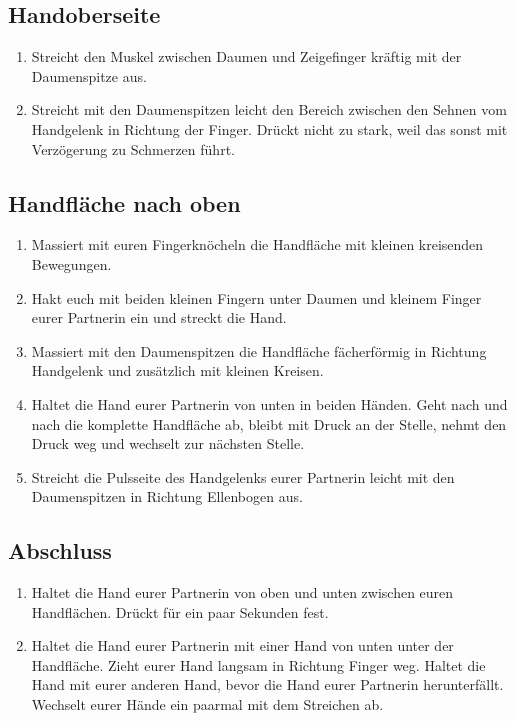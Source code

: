 \subsection{Handoberseite}
\begin{enumerate}
	\item {} Streicht den Muskel zwischen Daumen und Zeigefinger kräftig mit der Daumenspitze aus.
	\item {} Streicht mit den Daumenspitzen leicht den Bereich zwischen den Sehnen vom Handgelenk in Richtung der Finger. Drückt nicht zu stark, weil das sonst mit Verzögerung zu Schmerzen führt.
\end{enumerate}

\subsection{Handfläche nach oben}
\begin{enumerate}
	\item {} Massiert mit euren Fingerknöcheln die Handfläche mit kleinen kreisenden Bewegungen.
	\item {} Hakt euch mit beiden kleinen Fingern unter Daumen und kleinem Finger eurer Partnerin ein und streckt die Hand.
	\item {} Massiert mit den Daumenspitzen die Handfläche fächerförmig in Richtung Handgelenk und zusätzlich mit kleinen Kreisen.
	\item {} Haltet die Hand eurer Partnerin von unten in beiden Händen. Geht nach und nach die komplette Handfläche ab, bleibt mit Druck an der Stelle, nehmt den Druck weg und wechselt zur nächsten Stelle.
	\item {} Streicht die Pulsseite des Handgelenks eurer Partnerin leicht mit den Daumenspitzen in Richtung Ellenbogen aus.
\end{enumerate}

\subsection{Abschluss}
\begin{enumerate}
	\item {} Haltet die Hand eurer Partnerin von oben und unten zwischen euren Handflächen. Drückt für ein paar Sekunden fest.
	\item {} Haltet die Hand eurer Partnerin mit einer Hand von unten unter der Handfläche. Zieht eurer Hand langsam in Richtung Finger weg. Haltet die Hand mit eurer anderen Hand, bevor die Hand eurer Partnerin herunterfällt. Wechselt eurer Hände ein paarmal mit dem Streichen ab.
\end{enumerate}
